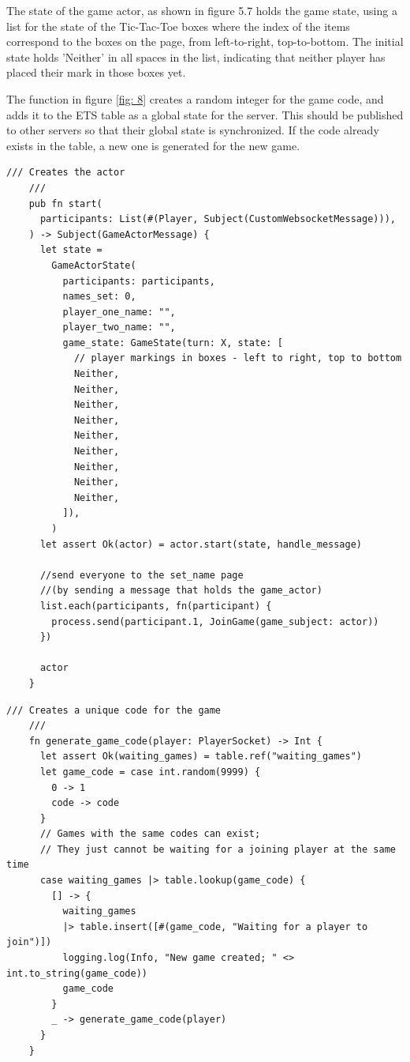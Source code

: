 \documentclass[]{final}
\begin{document}
\begin{minipage}[t]{18em}
  The state of the game actor, as shown in figure 5.7
  holds the game state, using a list for the state of the Tic-Tac-Toe boxes
  where the index of the items correspond to the boxes on the page, from
  left-to-right, top-to-bottom. The initial state holds 'Neither' in
  all spaces in the list, indicating that neither player has placed
  their mark in those boxes yet.

  \vspace*{28em}

  The function in figure \ref{fig: 8} creates a random integer for the game code,
  and adds it to the ETS table as a global state for the server. This should be
  published to other servers so that their global state is synchronized. If the
  code already exists in the table, a new one is generated for the new game.
\end{minipage}
\hfill
\begin{minipage}[t]{20em}
  \begin{lstlisting}[language=gleam]
    /// Creates the actor
    ///
    pub fn start(
      participants: List(#(Player, Subject(CustomWebsocketMessage))),
    ) -> Subject(GameActorMessage) {
      let state =
        GameActorState(
          participants: participants,
          names_set: 0,
          player_one_name: "",
          player_two_name: "",
          game_state: GameState(turn: X, state: [
            // player markings in boxes - left to right, top to bottom
            Neither,
            Neither,
            Neither,
            Neither,
            Neither,
            Neither,
            Neither,
            Neither,
            Neither,
          ]),
        )
      let assert Ok(actor) = actor.start(state, handle_message)

      //send everyone to the set_name page
      //(by sending a message that holds the game_actor)
      list.each(participants, fn(participant) {
        process.send(participant.1, JoinGame(game_subject: actor))
      })

      actor
    }
  \end{lstlisting}
  \label{fig: 7}
  \vspace*{1.5cm}
  \begin{lstlisting}[language=gleam]
    /// Creates a unique code for the game
    ///
    fn generate_game_code(player: PlayerSocket) -> Int {
      let assert Ok(waiting_games) = table.ref("waiting_games")
      let game_code = case int.random(9999) {
        0 -> 1
        code -> code
      }
      // Games with the same codes can exist;
      // They just cannot be waiting for a joining player at the same time
      case waiting_games |> table.lookup(game_code) {
        [] -> {
          waiting_games
          |> table.insert([#(game_code, "Waiting for a player to join")])
          logging.log(Info, "New game created; " <> int.to_string(game_code))
          game_code
        }
        _ -> generate_game_code(player)
      }
    }
  \end{lstlisting}
  \label{fig: 8}
\end{minipage}
\end{document}
